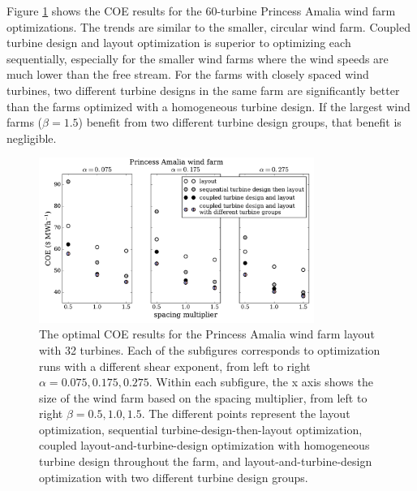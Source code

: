 Figure \ref{amalia_results} shows the COE results for the 60-turbine Princess Amalia wind farm optimizations.  The trends are similar to the smaller, circular wind farm. Coupled turbine design and layout optimization is superior to optimizing each sequentially, especially for the smaller wind farms where the wind speeds are much lower than the free stream. For the farms with closely spaced wind turbines, two different turbine designs in the same farm are significantly better than the farms optimized with a homogeneous turbine design. If the largest wind farms ($\beta=1.5$) benefit from two different turbine design groups, that benefit is negligible. 

\begin{figure}[htbp]
  \centering
  \includegraphics[width=0.8\textwidth]{Figures/amalia_results1.pdf}
  \caption{\label{amalia_results} The optimal COE results for the Princess Amalia wind farm layout with 32 turbines. Each of the subfigures corresponds to optimization runs with a different shear exponent, from left to right $\alpha=0.075,0.175,0.275$. Within each subfigure, the x axis shows the size of the wind farm based on the spacing multiplier, from left to right $\beta=0.5,1.0,1.5$. The different points represent the layout optimization, sequential turbine-design-then-layout optimization, coupled layout-and-turbine-design optimization with homogeneous turbine design throughout the farm, and layout-and-turbine-design optimization with two different turbine design groups.}
\end{figure}

